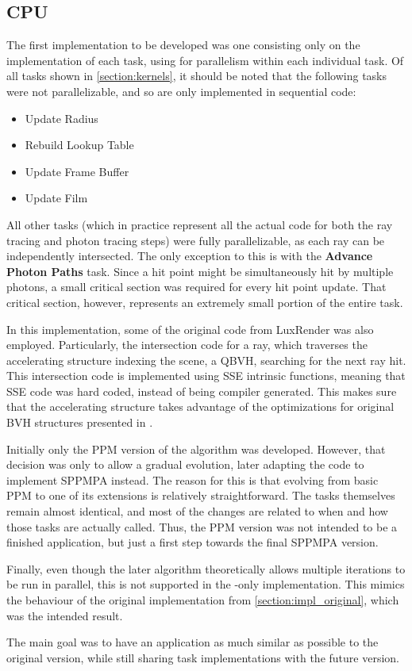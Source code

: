 \documentclass[main.tex]{subfiles}
\begin{document}
\subsection{CPU} \label{section:impl_cpu}

The first implementation to be developed was one consisting only on the implementation of each task, using \openmp for parallelism within each individual task. Of all tasks shown in \cref{section:kernels}, it should be noted that the following tasks were not parallelizable, and so are only implemented in sequential code:
\begin{itemize}
  \item Update Radius
  \item Rebuild Lookup Table
  \item Update Frame Buffer
  \item Update Film
\end{itemize}

All other tasks (which in practice represent all the actual code for both the ray tracing and photon tracing steps) were fully parallelizable, as each ray can be independently intersected. The only exception to this is with the \textbf{Advance Photon Paths} task. Since a hit point might be simultaneously hit by multiple photons, a small critical section was required for every hit point update. That critical section, however, represents an extremely small portion of the entire task.

In this implementation, some of the original code from LuxRender was also employed. Particularly, the intersection code for a ray, which traverses the accelerating structure indexing the scene, a \acf{QBVH}, searching for the next ray hit.
This intersection code is implemented using SSE intrinsic functions, meaning that SSE code was hard coded, instead of being compiler generated. This makes sure that the accelerating structure takes advantage of the optimizations for original \acs{BVH} structures presented in \cite{dammertz2008shallow}.


Initially only the PPM version of the algorithm was developed. However, that decision was only to allow a gradual evolution, later adapting the code to implement SPPMPA instead. The reason for this is that evolving from basic PPM to one of its extensions is relatively straightforward. The tasks themselves remain almost identical, and most of the changes are related to when and how those tasks are actually called. Thus, the PPM version was not intended to be a finished application, but just a first step towards the final SPPMPA version.

Finally, even though the later algorithm theoretically allows multiple iterations to be run in parallel, this is not supported in the \cpu-only implementation. This mimics the behaviour of the original implementation from \cref{section:impl_original}, which was the intended result.

The main goal was to have an application as much similar as possible to the original \cpu version, while still sharing task implementations with the future \starpu version.
\end{document}
